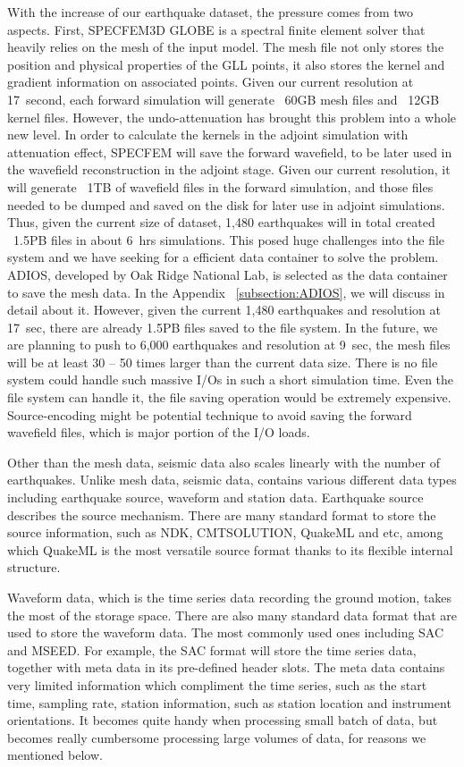 With the increase of our earthquake dataset, the pressure comes from two aspects.
First, SPECFEM3D GLOBE is a spectral finite element solver that heavily
relies on the mesh of the input model. The mesh file not only stores
the position and physical properties of the GLL points, it also stores
the kernel and gradient information on associated points. Given our current
resolution at 17~second, each forward simulation will generate ~60GB mesh
files and ~12GB kernel files. However, the undo-attenuation has brought this
problem into a whole new level. In order to calculate the kernels in the adjoint
simulation with attenuation effect, SPECFEM will save the forward wavefield,
to be later used in the wavefield reconstruction in the adjoint stage.
Given our current resolution,
it will generate ~1TB of wavefield files in the forward simulation, and those
files needed to be dumped and saved on the disk for later use in adjoint simulations.
Thus, given the current size of dataset,
1,480 earthquakes will in total created ~1.5PB files in about 6~hrs simulations.
This posed huge challenges into the file system and we have seeking for
a efficient data container to solve the problem. ADIOS, developed by Oak Ridge
National Lab, is selected as the data container to save the mesh data.
In the Appendix ~\ref{subsection:ADIOS}, we will discuss in detail about it.
However, given the current 1,480 earthquakes and resolution at 17~sec,
there are already 1.5PB files saved to the file system. In the future, we are
planning to push to 6,000 earthquakes and resolution at 9~sec, the mesh files
will be at least 30 -- 50 times larger than the current data size. There is no file
system could handle such massive I/Os in such a short simulation time. Even
the file system can handle it, the file saving operation would be extremely 
expensive. Source-encoding might be potential technique to avoid saving the forward
wavefield files, which is major portion of the I/O loads.

Other than the mesh data, seismic data also scales linearly with the number
of earthquakes. Unlike mesh data, seismic data, contains various different
data types including earthquake source, waveform and station data.
Earthquake source describes the source mechanism. There are many standard
format to store the source information, such as NDK, CMTSOLUTION, QuakeML and etc,
among which QuakeML is the most versatile source format thanks to its flexible
internal structure.

Waveform data, which is the time series data recording the ground motion, takes
the most of the storage space.
There are also many standard data format that are used to store the waveform
data. The most commonly used ones including SAC and MSEED. For example, the SAC format
will store the time series data, together with meta data
in its pre-defined header slots. The meta data contains very limited information
which compliment the time series, such as the start time, sampling rate, station
information, such as station location and instrument orientations. It becomes quite
handy when processing small batch of data, but becomes really cumbersome processing
large volumes of data, for reasons we mentioned below.

